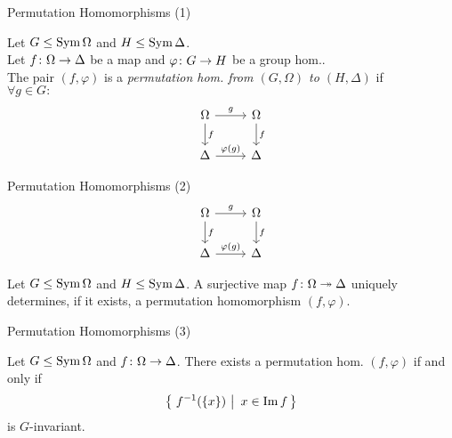 \begin{frame}{Permutation Homomorphisms (1)}
    \begin{defn}
        Let $G \leq \operatorname{Sym} \Omega$ and $H \leq \operatorname{Sym} \Delta$.
        \\
        \pause
        Let
        $f \colon \Omega \rightarrow \Delta$
        be a map
        and
        $\varphi \colon G \rightarrow H$
        be a group hom..
        \\
        \pause
        The pair $(f, \varphi)$ is a
        \emph{%
        permutation hom. from $(G, \Omega)$ to $(H, \Delta)$
        }
        if
        \\
        \pause
        $\forall g \in G :$
        \[
        \begin{tikzcd}[ampersand replacement=\&]
            \Omega
                \ar[r, "g"]
                \ar[d, "f"]
            \&
            \Omega
                \ar[d, "f"]
            \\
            \Delta
                \ar[r, "\varphi(g)"]
            \&
            \Delta
        \end{tikzcd}
        \]
    \end{defn}
\end{frame}

\begin{frame}{Permutation Homomorphisms (2)}
    \[
    \begin{tikzcd}[ampersand replacement=\&]
        \Omega
            \ar[r, "g"]
            \ar[d, "f"]
        \&
        \Omega
            \ar[d, "f"]
        \\
        \Delta
            \ar[r, "\varphi(g)"]
        \&
        \Delta
    \end{tikzcd}
    \]

    \begin{rem}
        Let $G \leq \operatorname{Sym} \Omega$ and $H \leq \operatorname{Sym} \Delta$.
        A surjective map $f \colon \Omega \twoheadrightarrow \Delta$ uniquely determines,
        if it exists,
        a permutation homomorphism
        $(f, \varphi)$.
    \end{rem}
\end{frame}

\begin{frame}{Permutation Homomorphisms (3)}
    \begin{lemma}
        Let $G \leq \operatorname{Sym} \Omega$ and $f \colon \Omega \rightarrow \Delta$.
        There exists a permutation hom.
        $(f, \varphi)$
        if and only if
        \pause
        \[
             \left\{ \left.\,  f ^ {-1}( \left\{ x \right\} )  ~\right|~  x \in \operatorname{Im} f  \,\right\} 
        \]
        is $G$-invariant.
    \end{lemma}
\end{frame}

